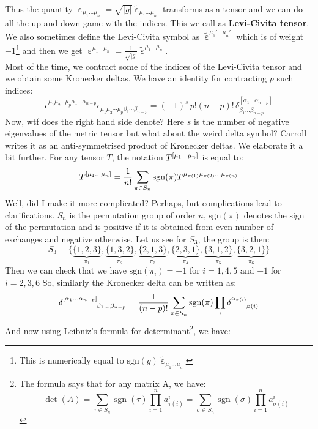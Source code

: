 Thus the quantity ${\upepsilon}_{\mu_1\ldots\mu_n} = \sqrt{|g|}\widetilde{\upepsilon}_{\mu_1\ldots\mu_n}$ transforms as a tensor and we can do all the up and down game with the indices. This we call as \textbf{Levi-Civita tensor}. We also sometimes define the Levi-Civita symbol as $\widetilde{\upepsilon}^{\mu_1'\ldots \mu_n'}$ which is of weight $-1$\footnote{This is numerically equal to $\mathrm{sgn}(g) \widetilde{\upepsilon}_{\mu_1\ldots\mu_n}$} and then we get ${\upepsilon}^{\mu_1\ldots\mu_n} = \frac{1}{\sqrt{|g|}}\widetilde{\upepsilon}^{\mu_1\ldots\mu_n}$.\\[0.3cm]
Most of the time, we contract some of the indices of the Levi-Civita tensor and we obtain some Kronecker deltas. We have an identity for contracting $p$ such indices: 
$$\epsilon^{\mu_1 \mu_2 \cdots \mu_p \alpha_1 \cdots \alpha_{n-p}} 
\epsilon_{\mu_1 \mu_2 \cdots \mu_p \beta_1 \cdots \beta_{n-p}} 
= (-1)^s\, p!(n - p)! \, \delta^{[\alpha_1\ldots \alpha_{n-p}]}_{\beta_1\ldots \beta_{n-p}}$$
Now, wtf does the right hand side denote? Here $s$ is the number of negative eigenvalues of the metric tensor but what about the weird delta symbol? Carroll writes it as an anti-symmetrised product of Kronecker deltas. We elaborate it a bit further. For any tensor $T$, the notation $\tensor{T}{^{[\mu_1\ldots\mu_n]}}$ is equal to: 
$$\tensor{T}{^{[\mu_1\ldots\mu_n]}} = \frac{1}{n!}\sum\limits_{\pi \in S_n}\mathrm{sgn}(\pi)\tensor{T}{^{\mu_{\pi(1)}\mu_{\pi(2)}\ldots\mu_{\pi(n)}}}$$
Well, did I make it more complicated? Perhaps, but complications lead to clarifications. $S_n$ is the permutation group of order $n$, $\mathrm{sgn}(\pi)$ denotes the sign of the permutation and is positive if it is obtained from even number of exchanges and negative otherwise. Let us see for $S_3$, the group is then:
$$S_3\equiv  \{\underbrace{\{1,2,3\}}_{\pi_1},\underbrace{\{1,3,2\}}_{\pi_2},\underbrace{\{2,1,3\}}_{\pi_3},\underbrace{\{2,3,1\}}_{\pi_4},\underbrace{\{3,1,2\}}_{\pi_5},\underbrace{\{3,2,1\}}_{\pi_6} \}$$
Then we can check that we have $\mathrm{sgn}(\pi_i) = +1$ for $i=1,4,5$ and $-1$ for $i=2,3,6$
So, similarly the Kronecker delta can be written as: 
$$\tensor{\delta}{^{[\alpha_1\ldots\alpha_{n-p}]} _{\beta_1\ldots\beta_{n-p}}} = \frac{1}{(n-p)!}\sum\limits_{\pi \in S_n}\mathrm{sgn}(\pi) \prod\limits_i \tensor{\delta}{^{\alpha_{\pi(i)}} _{\beta(i)}}$$
And now using Leibniz's formula for determinant\footnote{The formula says that for any matrix A, we have:
$$\det(A) = \sum_{\tau \in S_n} \operatorname{sgn}(\tau) \prod_{i=1}^{n} a^{i}_{\tau(i)} 
= \sum_{\sigma \in S_n} \operatorname{sgn}(\sigma) \prod_{i=1}^{n} a_{\sigma(i)}^{i}$$
}, we have: 
